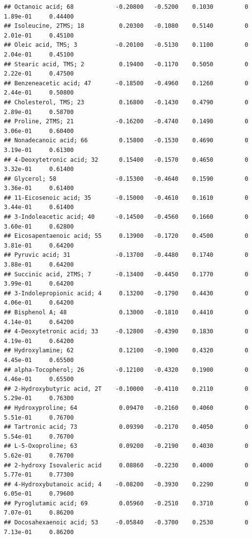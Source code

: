 \documentclass[]{article}
\begin{document}
\begin{verbatim}
## Octanoic acid; 68            -0.20800   -0.5200    0.1030         0   1.89e-01     0.44400
## Isoleucine, 2TMS; 18          0.20300   -0.1080    0.5140         0   2.01e-01     0.45100
## Oleic acid, TMS; 3           -0.20100   -0.5130    0.1100         0   2.04e-01     0.45100
## Stearic acid, TMS; 2          0.19400   -0.1170    0.5050         0   2.22e-01     0.47500
## Benzeneacetic acid; 47       -0.18500   -0.4960    0.1260         0   2.44e-01     0.50800
## Cholesterol, TMS; 23          0.16800   -0.1430    0.4790         0   2.89e-01     0.58700
## Proline, 2TMS; 21            -0.16200   -0.4740    0.1490         0   3.06e-01     0.60400
## Nonadecanoic acid; 66         0.15800   -0.1530    0.4690         0   3.19e-01     0.61300
## 4-Deoxytetronic acid; 32      0.15400   -0.1570    0.4650         0   3.32e-01     0.61400
## Glycerol; 58                 -0.15300   -0.4640    0.1590         0   3.36e-01     0.61400
## 11-Eicosenoic acid; 35       -0.15000   -0.4610    0.1610         0   3.44e-01     0.61400
## 3-Indoleacetic acid; 40      -0.14500   -0.4560    0.1660         0   3.60e-01     0.62800
## Eicosapentaenoic acid; 55     0.13900   -0.1720    0.4500         0   3.81e-01     0.64200
## Pyruvic acid; 31             -0.13700   -0.4480    0.1740         0   3.88e-01     0.64200
## Succinic acid, 2TMS; 7       -0.13400   -0.4450    0.1770         0   3.99e-01     0.64200
## 3-Indolepropionic acid; 4     0.13200   -0.1790    0.4430         0   4.06e-01     0.64200
## Bisphenol A; 48               0.13000   -0.1810    0.4410         0   4.14e-01     0.64200
## 4-Deoxytetronic acid; 33     -0.12800   -0.4390    0.1830         0   4.19e-01     0.64200
## Hydroxylamine; 62             0.12100   -0.1900    0.4320         0   4.45e-01     0.65500
## alpha-Tocopherol; 26         -0.12100   -0.4320    0.1900         0   4.46e-01     0.65500
## 2-Hydroxybutyric acid, 2T    -0.10000   -0.4110    0.2110         0   5.29e-01     0.76300
## Hydroxyproline; 64            0.09470   -0.2160    0.4060         0   5.51e-01     0.76700
## Tartronic acid; 73            0.09390   -0.2170    0.4050         0   5.54e-01     0.76700
## L-5-Oxoproline; 63            0.09200   -0.2190    0.4030         0   5.62e-01     0.76700
## 2-hydroxy Isovaleric acid     0.08860   -0.2230    0.4000         0   5.77e-01     0.77300
## 4-Hydroxybutanoic acid; 4    -0.08200   -0.3930    0.2290         0   6.05e-01     0.79600
## Pyroglutamic acid; 69         0.05960   -0.2510    0.3710         0   7.07e-01     0.86200
## Docosahexaenoic acid; 53     -0.05840   -0.3700    0.2530         0   7.13e-01     0.86200

\end{verbatim}
\end{document}
